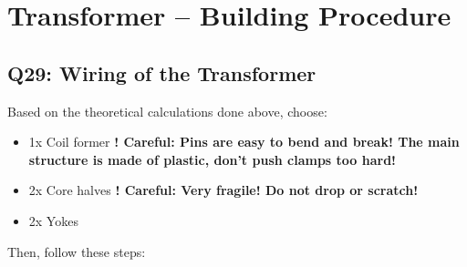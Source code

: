 \documentclass{PELsmallreport}
\begin{document}
\qquad {} \hfill{}






\newpage
\section{Transformer -- Building Procedure}





\subsection{Q29: Wiring of the Transformer} 
Based on the theoretical calculations done above, choose:  
\begin{itemize}
    \item 1x Coil former \textbf{! Careful: Pins are easy to bend and break! The main structure is made of plastic, don't push clamps too hard!}
    \item 2x Core halves \textbf{! Careful: Very fragile! Do not drop or scratch!}
    \item 2x Yokes
\end{itemize}
Then, follow these steps:
\end{document}
